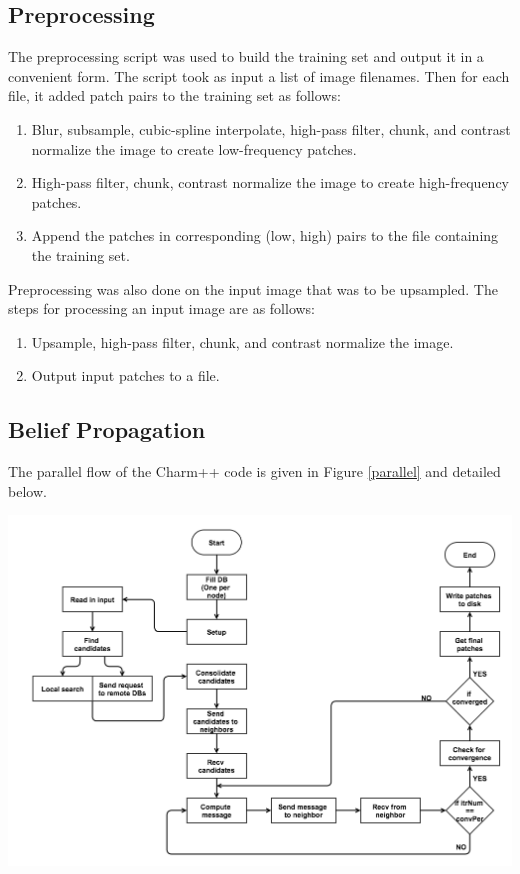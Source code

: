 \documentclass[a4paper]{article}
\begin{document}
\subsection{Preprocessing}
The preprocessing script was used to build the training set and output it in a convenient form. The script took as input a list of image filenames. Then for each file, it added patch pairs to the training set as follows:
\begin{enumerate}
		\item Blur, subsample, cubic-spline interpolate, high-pass filter, chunk, and contrast normalize the image to create low-frequency patches.
		\item High-pass filter, chunk, contrast normalize the image to create high-frequency patches.
		\item Append the patches in corresponding (low, high) pairs to the file containing the training set.
\end{enumerate}
Preprocessing was also done on the input image that was to be upsampled. The steps for processing an input image are as follows:
\begin{enumerate}
	\item Upsample, high-pass filter, chunk, and contrast normalize the image.
	\item Output input patches to a file.
\end{enumerate}

\subsection{Belief Propagation}
The parallel flow of the Charm++ code is given in Figure \ref{parallel} and detailed below.
\begin{center}
\includegraphics[scale=.4]{figs/flow}
\label{parallel}
\end{center}
\end{document}
